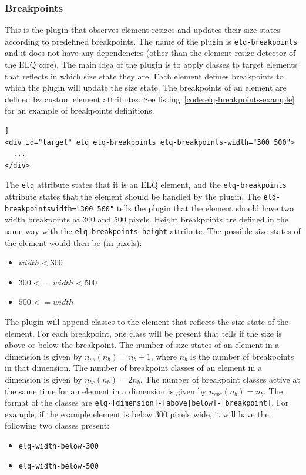 \documentclass[a4paper,11pt]{kth-mag}
\newcommand{\code}[1]{\texttt{#1}}
\newcommand\abbr[2][]{\uppercase{#2}\ifthenelse{\equal{#1}{}}%
                     {}{#1}}
\begin{document}
          \subsubsection{Breakpoints}
            This is the plugin that observes element resizes and updates their size states according to predefined breakpoints.
            The name of the plugin is \code{elq-breakpoints} and it does not have any dependencies (other than the element resize detector of the \abbr{elq} core).
            The main idea of the plugin is to apply classes to target elements that reflects in which size state they are.
            Each element defines breakpoints to which the plugin will update the size state.
            The breakpoints of an element are defined by custom element attributes.
            See listing~\ref{code:elq-breakpoints-example} for an example of breakpoints definitions.
            \begin{lstlisting}[caption={Example an \gls{HTML} element that uses the \code{elq-breakpoints} plugin.},captionpos=b,label={code:elq-breakpoints-example}]]
<div id="target" elq elq-breakpoints elq-breakpoints-width="300 500">
  ...
</div>
            \end{lstlisting}
            The \code{elq} attribute states that it is an \abbr{elq} element, and the \code{elq-breakpoints} attribute states that the element should be handled by the plugin.
            The \code{elq-breakpoints\-width="300 500"} tells the plugin that the element should have two width breakpoints at 300 and 500 pixels.
            Height breakpoints are defined in the same way with the \code{elq-breakpoints-height} attribute.
            The possible size states of the element would then be (in pixels):
            \begin{itemize}
              \item $width < 300$
              \item $300 <= width < 500$
              \item $500 <= width$
            \end{itemize}
            The plugin will append classes to the element that reflects the size state of the element.
            For each breakpoint, one class will be present that tells if the size is above or below the breakpoint.
            The number of size states of an element in a dimension is given by $n_{ss}(n_b) = n_b + 1$, where $n_b$ is the number of breakpoints in that dimension.
            The number of breakpoint classes of an element in a dimension is given by $n_{bc}(n_{b}) = 2n_b$.
            The number of breakpoint classes active at the same time for an element in a dimension is given by $n_{abc}(n_{b}) = n_{b}$.
            The format of the classes are \code{elq-[dimension]-[above|below]-[breakpoint]}.
            For example, if the example element is below 300 pixels wide, it will have the following two classes present:
            \begin{itemize}
              \item \code{elq-width-below-300}
              \item \code{elq-width-below-500}
            \end{itemize}
\end{document}
